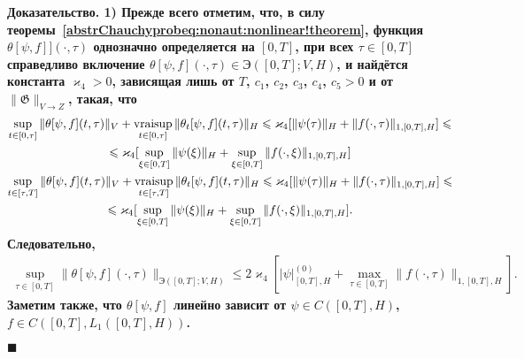 \documentclass{report}
\newcounter{rem}[section]
\newcounter{theor}[section]
\newenvironment{Proof}{\par\noindent\bf Доказательство.\rm}{ $\blacksquare$\par}
\newcommand{\vraisup}{\mathop{\rm vraisup}}
\begin{document}
\begin{Proof}
1) Прежде всего отметим, что, в силу теоремы~\ref{abstrChauchyprobeq:nonaut:nonlinear!theorem}, функция $\theta[\psi,f]](\cdot,\tau)$ 
однозначно определяется на $[0,T]$, при всех $\tau\in[0,T]$ справедливо включение $\theta[\psi,f](\cdot,\tau)\in{\textrm{Э}}([0,T];V,H)$, и найдётся константа 
$\varkappa_4>0$, зависящая лишь от $T$, $c_1$, $c_2$, $c_3$, $c_4$, $c_5>0$ и от $\|\mathfrak{G}\|_{V\to Z}$, такая, что
\begin{gather*}
\sup\limits_{t\in[0,\tau]}\|\theta[\psi,f](t,\tau)\|_{V}+\vraisup\limits_{t\in[0,\tau]}\|\theta_t[\psi,f](t,\tau)\|_{H}\leqslant\varkappa_4[\|\psi(\tau)\|_H+\|f(\cdot,\tau)\|_{1,[0,T],H}]\leqslant\\
\leqslant\varkappa_4[\sup\limits_{\xi\in[0,T]}\|\psi(\xi)\|_H+\sup\limits_{\xi\in[0,T]}\|f(\cdot,\xi)\|_{1,[0,T],H}]\\
\sup\limits_{t\in[\tau,T]}\|\theta[\psi,f](t,\tau)\|_{V}+\vraisup\limits_{t\in[\tau,T]}\|\theta_t[\psi,f](t,\tau)\|_{H}\leqslant\varkappa_4[\|\psi(\tau)\|_H+\|f(\cdot,\tau)\|_{1,[0,T],H}]\leqslant\\
\leqslant\varkappa_4[\sup\limits_{\xi\in[0,T]}\|\psi(\xi)\|_H+\sup\limits_{\xi\in[0,T]}\|f(\cdot,\xi)\|_{1,[0,T],H}].
\end{gather*}
Следовательно,
\begin{gather}\label{abstrChauchyprobeq:nonaut:parametric:non-homogenious.eq!theorem.theta.cont:auxiliary_a_priori_estimate}
\sup\limits_{\tau\in[0,T]}\|\theta[\psi,f](\cdot,\tau)\|_{\textrm{Э}([0,T];V,H)}\leqslant2\varkappa_4[\pmb{|}\psi\pmb{|}^{(0)}_{[0,T],H}+\max\limits_{\tau\in[0,T]}\|f(\cdot,\tau)\|_{1,[0,T],H}].
\end{gather}
Заметим также, что $\theta[\psi,f]$ линейно зависит от $\psi\in C([0,T],H)$, $f\in C([0,T],L_1([0,T],H))$.


\end{Proof}
\end{document}
